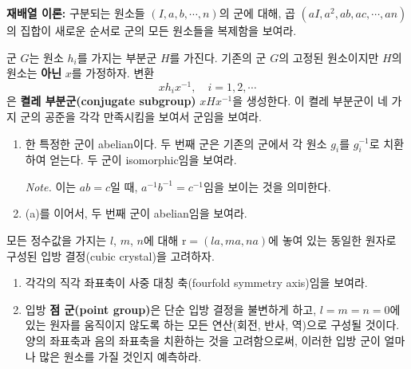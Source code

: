 \begin{question}
	\textbf{재배열 이론:} 구분되는 원소들 $(I, a, b, \cdots, n)$의 군에 대해, 곱 $(aI, a^2, ab,ac, \cdots, an)$의 집합이 새로운 순서로 군의 모든 원소들을 복제함을 보여라.
\end{question}

\begin{question}
	군 $G$는 원소 $h_i$를 가지는 부분군 $H$를 가진다. 기존의 군 $G$의 고정된 원소이지만 $H$의 원소는 \textbf{아닌} $x$를 가정하자. 변환
	\begin{equation}
		xh_ix^{-1}, \quad i = 1, 2, \cdots
	\end{equation}
	은 \textbf{켤레 부분군(conjugate subgroup)} $xHx^{-1}$을 생성한다. 이 켤레 부분군이 네 가지 군의 공준을 각각 만족시킴을 보여서 군임을 보여라.
\end{question}

\begin{question}
		\vspace{-2.0em}
		\begin{enumerate}[label=(\alph*), leftmargin=*, parsep=0em, topsep=0pt]
			\item 한 특정한 군이 abelian이다. 두 번째 군은 기존의 군에서 각 원소 $g_i$를 $g_i^{-1}$로 치환하여 얻는다. 두 군이 isomorphic임을 보여라.
			
			\textit{Note.} 이는 $ab=c$일 때, $a^{-1}b^{-1}=c^{-1}$임을 보이는 것을 의미한다.
			\item (a)를 이어서, 두 번째 군이 abelian임을 보여라.
		\end{enumerate}
	\end{question}
	
	\begin{question}
		모든 정수값을 가지는 $l$, $m$, $n$에 대해 $\bm{\mathrm{r}}=(la, ma, na)$에 놓여 있는 동일한 원자로 구성된 입방 결정(cubic crystal)을 고려하자.
		\begin{enumerate}[label=(\alph*), leftmargin=*, parsep=0em, topsep=0pt]
			\item 각각의 직각 좌표축이 사중 대칭 축(fourfold symmetry axis)임을 보여라.
			\item 입방 \textbf{점 군(point group)}은 단순 입방 결정을 불변하게 하고, $l=m=n=0$에 있는 원자를 움직이지 않도록 하는 모든 연산(회전, 반사, 역)으로 구성될 것이다. 양의 좌표축과 음의 좌표축을 치환하는 것을 고려함으로써, 이러한 입방 군이 얼마나 많은 원소를 가질 것인지 예측하라.
		\end{enumerate}
	\end{question}
	

